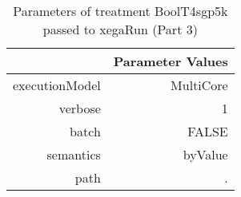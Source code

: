 \begin{table}[ht]
\centering
\begin{tabular}{rr}
  \hline
 & Parameter Values \\ 
  \hline
executionModel & MultiCore \\ 
  verbose & 1 \\ 
  batch & FALSE \\ 
  semantics & byValue \\ 
  path & . \\ 
   \hline
\end{tabular}
\caption{ Parameters of treatment BoolT4sgp5k passed to xegaRun
 (Part 3)} 
\end{table}
